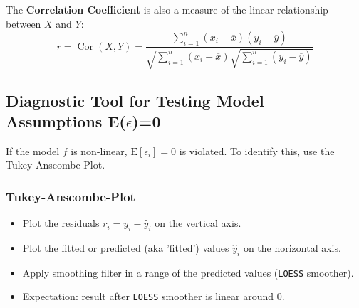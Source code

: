 \documentclass[11pt]{article}
\newcommand*\samplemean[1]{\overline{#1}}
\newcommand*\ev[1]{\mathrel{\text{E}\left[#1\right]}}
\newcommand*\Cor[1]{\mathop{\text{Cor}}\left(#1\right)}
\begin{document}
\noindent
The \textbf{Correlation Coefficient} is also a measure of the linear relationship between $X$ and $Y$:
\begin{equation*}
	r = \Cor{X,Y} = \frac{\sum_{i=1}^{n}(x_i - \samplemean{x})(y_i - \samplemean{y})}{\sqrt{\sum_{i=1}^{n} (x_i - \samplemean{x})}\sqrt{\sum_{i=1}^{n} (y_i - \samplemean{y})}}
\end{equation*}

\newpage
\subsection{Diagnostic Tool for Testing Model Assumptions E\texorpdfstring{($\epsilon$)=}\ 0}
If the model $f$ is non-linear, $\ev{\epsilon_i} = 0$ is violated. To identify this, use the Tukey-Anscombe-Plot.
\subsubsection{Tukey-Anscombe-Plot}
\begin{itemize}[noitemsep]
	\item Plot the residuals $r_i = y_i - \hat{y}_i$ on the vertical axis.
	\item Plot the fitted or predicted (aka 'fitted') values $\hat{y}_i$ on the horizontal axis.
	\item Apply smoothing filter in a range of the predicted values (\texttt{LOESS} smoother).
	\item Expectation: result after \texttt{LOESS} smoother is linear around 0.
\end{itemize}
\end{document}
